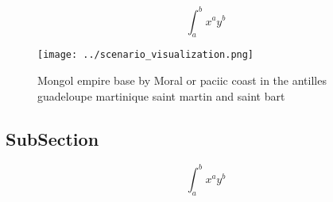 \documentclass[a4paper]{article}
\begin{document}
\[ \int_{a}^{b}{x^{a}y^{b}} \]

\begin{figure}
\centering
\texttt{[image: ../scenario\_visualization.png]}
\caption{Mongol empire base by Moral or paciic coast in the antilles guadeloupe martinique saint martin and saint bart
}
\end{figure}
 
\subsection{SubSection}

\[ \int_{a}^{b}{x^{a}y^{b}} \]
\end{document}
